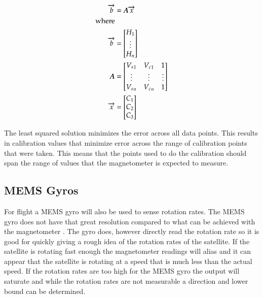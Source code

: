 \begin{equation}
    \label{eq:magmat}
    \begin{split}
    \vect{b}&=\matt{A} \vect{x} \\
    {\text{\raggedright where}} \\
    \vect{b}&= 
    \begin{bmatrix}
        H_1 \\
        \vdots \\
        H_n \\
    \end{bmatrix} \\
    \matt{A}&=
    \begin{bmatrix}
        {V_s}_1 & {V_c}_1 & 1 \\
        \vdots & \vdots & \vdots\\
        {V_s}_n & {V_c}_n & 1 \\
    \end{bmatrix} \\
    \vect{x}&= 
    \begin{bmatrix}
        C_1 \\
        C_2 \\
        C_3 \\
    \end{bmatrix} 
    \end{split}
\end{equation}

The least squared solution minimizes the error across all data points. This results in calibration values that minimize error across the range of calibration points that were taken. This means that the points used to do the calibration should span the range of values that the magnetometer is expected to measure. 

\subsection{\acs{MEMS} Gyros}

For flight a \ac{MEMS} gyro will also be used to sense rotation rates. The \ac{MEMS} gyro does not have that great resolution compared to what can be achieved with the magnetometer . The gyro does, however directly read the rotation rate so it is good for quickly giving a rough idea of the rotation rates of the satellite. If the satellite is rotating fast enough the magnetometer readings will alias and it can appear that the satellite is rotating at a speed that is much less than the actual speed. If the rotation rates are too high for the \ac{MEMS} gyro the output will saturate and while the rotation rates are not measurable a direction and lower bound can be determined.


